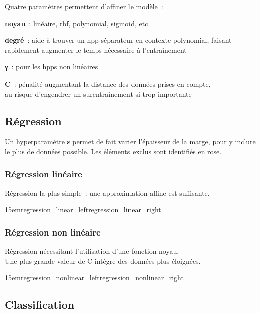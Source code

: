 Quatre paramètres permettent d’affiner le modèle :
\begin{itmz}
\item{\textbf{noyau} : linéaire, \gls{rbf}, polynomial, \gls{sigmoid}, etc.}
\item{\textbf{degré} : aide à trouver un \gls{hpp} séparateur en contexte polynomial,
faisant rapidement augmenter le temps nécessaire à l’entraînement}
\item{\textbf{γ} : pour les \glspl{hpp} non linéaires}
\item{\textbf{C} : pénalité augmentant la distance des données prises en compte,\\
au risque d’engendrer un surentraînement si trop importante}
\end{itmz}

\pagebreak

\subsection{Régression}

Un hyperparamètre \textbf{ε} permet de fait varier l’épaisseur de la marge,
pour y inclure le plus de données possible.
Les éléments exclus sont identifiés en rose.

\subsubsection{Régression linéaire}

Régression la plus simple : une approximation affine est suffisante.

{15em}{regression_linear_left}{regression_linear_right}

\subsubsection{Régression non linéaire}

Régression nécessitant l’utilisation d’une fonction noyau.\\
Une plus grande valeur de C intègre des données plus éloignées.

{15em}{regression_nonlinear_left}{regression_nonlinear_right}

\pagebreak

\subsection{Classification}


